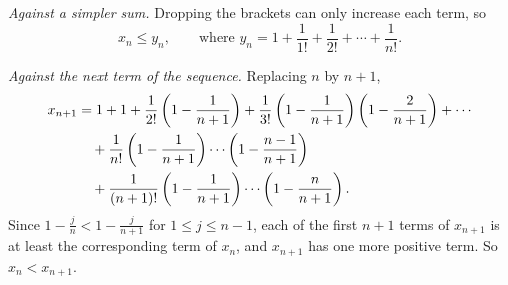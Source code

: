\emph{Against a simpler sum.} Dropping the brackets can only increase each term, so
\begin{equation*}
    x_n \leq y_n, \qquad\text{where } y_n = 1 + \frac{1}{1!} + \frac{1}{2!} + \cdots + \frac{1}{n!}.
\end{equation*}

\emph{Against the next term of the sequence.} Replacing $n$ by $n+1$,
\begin{align*}
    x_{n + 1} &= 1 + 1 + \frac{1}{2!}\left(1 - \frac{1}{n + 1}\right) + \frac{1}{3!}\left(1 - \frac{1}{n + 1}\right)\left(1 - \frac{2}{n + 1}\right) + \cdots\\
    &\quad + \frac{1}{n!}\left(1 - \frac{1}{n + 1}\right) \cdots \left(1 - \frac{n - 1}{n + 1}\right)\\
    &\quad + \frac{1}{(n + 1)!}\left(1 - \frac{1}{n + 1}\right) \cdots \left(1 - \frac{n}{n + 1}\right).
\end{align*}
Since $1-\frac jn<1-\frac j{n+1}$ for $1\leq j\leq n-1$, each of the first $n+1$ terms of $x_{n+1}$ is at least the corresponding term of $x_n$, and $x_{n+1}$ has one more positive term. So $x_n<x_{n+1}$.

